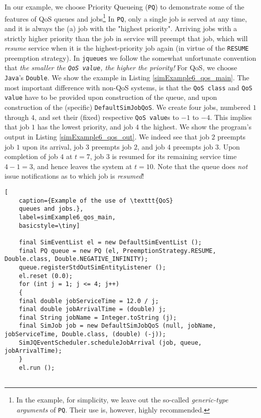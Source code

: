 In our example, we choose Priority Queueing (\lstinline|PQ|)
to demonstrate some of the features of QoS queues and jobs\footnote{
	In the example, for simplicity,
	we leave out the so-called {\em generic-type arguments\/}
	of \lstinline|PQ|.
	Their use is, however, highly recommended.}
In \lstinline|PQ|,
only a single job is served at any time,
and it is always the (a) job with the "highest priority".
Arriving jobs with a strictly higher priority
than the job in service will preempt that job,
which will {\em resume\/} service when it is the
highest-priority job again
(in virtue of the \lstinline|RESUME|
preemption strategy).
In \lstinline|jqueues| we follow
the somewhat unfortunate convention
that {\em the smaller the \lstinline|QoS value|,
	the higher the priority!\/}
For QoS, we choose \lstinline|Java|'s \lstinline|Double|.
We show the example in Listing \ref{simExample6_qos_main}.
The most important difference with non-QoS systems,
is that the \lstinline|QoS class|
and \lstinline|QoS value| have to be provided upon construction
of the queue, and upon construction of the
(specific) \lstinline|DefaultSimJobQoS|.
We create four jobs, numbered $1$ through $4$,
and set their (fixed) respective \lstinline|QoS value|s
to $-1$ to $-4$.
This implies that job $1$ has the lowest priority,
and job $4$ the highest.
We show the program's output in Listing \ref{simExample6_qos_out}.
We indeed see that job $2$ preempts job $1$ upon its arrival,
job $3$ preempts job $2$, and job $4$ preempts job $3$.
Upon completion of job $4$ at $t=7$,
job $3$ is resumed for its remaining service time $4-1=3$,
and hence leaves the system at $t=10$.
Note that the queue does {\em not\/} issue notifications
as to which job is {\em resumed\/}!

\begin{lstfloat}
	\begin{lstlisting}[
	caption={Example of the use of \texttt{QoS}
	queues and jobs.},
	label=simExample6_qos_main,
	basicstyle=\tiny]
	
	final SimEventList el = new DefaultSimEventList ();
	final PQ queue = new PQ (el, PreemptionStrategy.RESUME, Double.class, Double.NEGATIVE_INFINITY);
	queue.registerStdOutSimEntityListener ();
	el.reset (0.0);
	for (int j = 1; j <= 4; j++)
	{
	final double jobServiceTime = 12.0 / j;
	final double jobArrivalTime = (double) j;
	final String jobName = Integer.toString (j);
	final SimJob job = new DefaultSimJobQoS (null, jobName, jobServiceTime, Double.class, (double) (-j));
	SimJQEventScheduler.scheduleJobArrival (job, queue, jobArrivalTime);
	}
	el.run ();
	
	\end{lstlisting}
\end{lstfloat}

